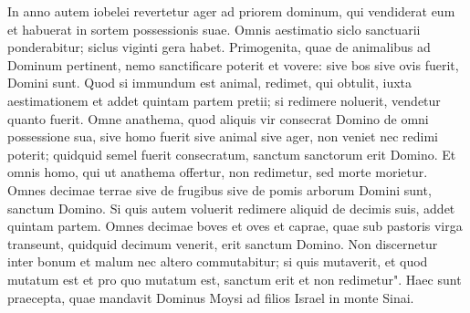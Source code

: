 \begin{biblechapter}
\verse In anno autem iobelei revertetur ager ad priorem dominum, qui vendiderat eum et habuerat in sortem possessionis suae. 
\verse Omnis aestimatio siclo sanctuarii ponderabitur; siclus viginti gera habet. 
\verse Primogenita, quae de animalibus ad Dominum pertinent, nemo sanctificare poterit et vovere: sive bos sive ovis fuerit, Domini sunt. 
\verse Quod si immundum est animal, redimet, qui obtulit, iuxta aestimationem et addet quintam partem pretii; si redimere noluerit, vendetur quanto fuerit. 
\verse Omne anathema, quod aliquis vir consecrat Domino de omni possessione sua, sive homo fuerit sive animal sive ager, non veniet nec redimi poterit; quidquid semel fuerit consecratum, sanctum sanctorum erit Domino. 
\verse Et omnis homo, qui ut anathema offertur, non redimetur, sed morte morietur. 
\verse Omnes decimae terrae sive de frugibus sive de pomis arborum Domini sunt, sanctum Domino. 
\verse Si quis autem voluerit redimere aliquid de decimis suis, addet quintam partem. 
\verse Omnes decimae boves et oves et caprae, quae sub pastoris virga transeunt, quidquid decimum venerit, erit sanctum Domino. 
\verse Non discernetur inter bonum et malum nec altero commutabitur; si quis mutaverit, et quod mutatum est et pro quo mutatum est, sanctum erit et non redimetur". 
\verse Haec sunt praecepta, quae mandavit Dominus Moysi ad filios Israel in monte Sinai.
\end{biblechapter}
